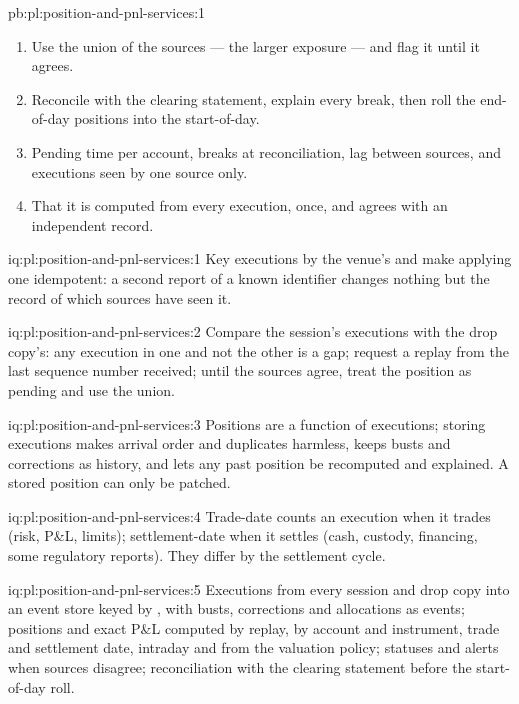 \begin{solution}{pb:pl:position-and-pnl-services:1}
\begin{enumerate}
\item Use the union of the sources --- the larger exposure --- and flag it until it agrees.
\item Reconcile with the clearing statement, explain every break, then roll the end-of-day positions into the start-of-day.
\item Pending time per account, breaks at reconciliation, lag between sources, and executions seen by one source only.
\item That it is computed from every execution, once, and agrees with an independent record.
\end{enumerate}
\end{solution}

\begin{solution}{iq:pl:position-and-pnl-services:1}
Key executions by the venue's  and make applying one idempotent: a second report of a known identifier changes nothing
but the record of which sources have seen it.
\end{solution}

\begin{solution}{iq:pl:position-and-pnl-services:2}
Compare the session's executions with the drop copy's: any execution in one and not the other is a gap; request a replay from the last
sequence number received; until the sources agree, treat the position as pending and use the union.
\end{solution}

\begin{solution}{iq:pl:position-and-pnl-services:3}
Positions are a function of executions; storing executions makes arrival order and duplicates harmless, keeps busts and corrections as
history, and lets any past position be recomputed and explained. A stored position can only be patched.
\end{solution}

\begin{solution}{iq:pl:position-and-pnl-services:4}
Trade-date counts an execution when it trades (risk, P\&L, limits); settlement-date when it settles (cash, custody, financing, some regulatory
reports). They differ by the settlement cycle.
\end{solution}

\begin{solution}{iq:pl:position-and-pnl-services:5}
Executions from every session and drop copy into an event store keyed by , with busts, corrections and allocations as
events; positions and exact P\&L computed by replay, by account and instrument, trade and settlement date, intraday and  from
the valuation policy; statuses and alerts when sources disagree; reconciliation with the clearing statement before the start-of-day roll.
\end{solution}
